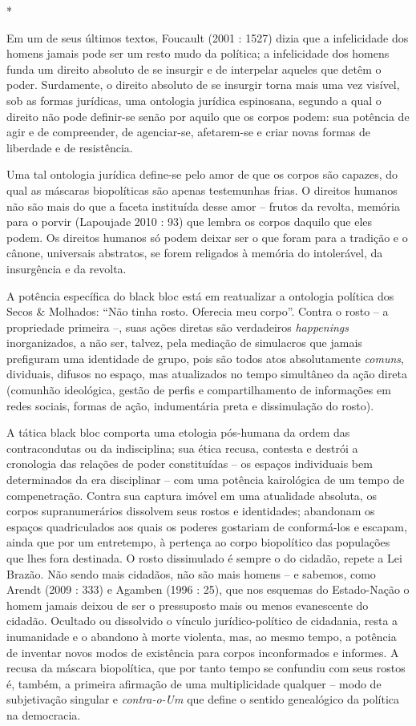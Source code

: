 *

Em um de seus últimos textos, Foucault (2001 : 1527) dizia que a
infelicidade dos homens jamais pode ser um resto mudo da política; a
infelicidade dos homens funda um direito absoluto de se insurgir e de
interpelar aqueles que detêm o poder. Surdamente, o direito absoluto de
se insurgir torna mais uma vez visível, sob as formas jurídicas, uma
ontologia jurídica espinosana, segundo a qual o direito não pode
definir-se senão por aquilo que os corpos podem: sua potência de agir e
de compreender, de agenciar-se, afetarem-se e criar novas formas de
liberdade e de resistência.

Uma tal ontologia jurídica define-se pelo amor de que os corpos são
capazes, do qual as máscaras biopolíticas são apenas testemunhas frias.
O direitos humanos não são mais do que a faceta instituída desse amor --
frutos da revolta, memória para o porvir (Lapoujade 2010 : 93) que
lembra os corpos daquilo que eles podem. Os direitos humanos só podem
deixar ser o que foram para a tradição e o cânone, universais abstratos,
se forem religados à memória do intolerável, da insurgência e da
revolta.

A potência específica do black bloc está em reatualizar a ontologia
política dos Secos \& Molhados: ``Não tinha rosto. Oferecia meu corpo''.
Contra o rosto -- a propriedade primeira --, suas ações diretas são
verdadeiros \emph{happenings} inorganizados, a não ser, talvez, pela
mediação de simulacros que jamais prefiguram uma identidade de grupo,
pois são todos atos absolutamente \emph{comuns}, dividuais, difusos no
espaço, mas atualizados no tempo simultâneo da ação direta (comunhão
ideológica, gestão de perfis e compartilhamento de informações em redes
sociais, formas de ação, indumentária preta e dissimulação do rosto).

A tática black bloc comporta uma etologia pós-humana da ordem das
contracondutas ou da indisciplina; sua ética recusa, contesta e destrói
a cronologia das relações de poder constituídas -- os espaços
individuais bem determinados da era disciplinar -- com uma potência
kairológica de um tempo de compenetração. Contra sua captura imóvel em
uma atualidade absoluta, os corpos supranumerários dissolvem seus rostos
e identidades; abandonam os espaços quadriculados aos quais os poderes
gostariam de conformá-los e escapam, ainda que por um entretempo, à
pertença ao corpo biopolítico das populações que lhes fora destinada. O
rosto dissimulado é sempre o do cidadão, repete a Lei Brazão. Não sendo
mais cidadãos, não são mais homens -- e sabemos, como Arendt (2009 :
333) e Agamben (1996 : 25), que nos esquemas do Estado-Nação o homem
jamais deixou de ser o pressuposto mais ou menos evanescente do cidadão.
Ocultado ou dissolvido o vínculo jurídico-político de cidadania, resta a
inumanidade e o abandono à morte violenta, mas, ao mesmo tempo, a
potência de inventar novos modos de existência para corpos inconformados
e informes. A recusa da máscara biopolítica, que por tanto tempo se
confundiu com seus rostos é, também, a primeira afirmação de uma
multiplicidade qualquer -- modo de subjetivação singular e
\emph{contra-o-Um} que define o sentido genealógico da política na
democracia.

